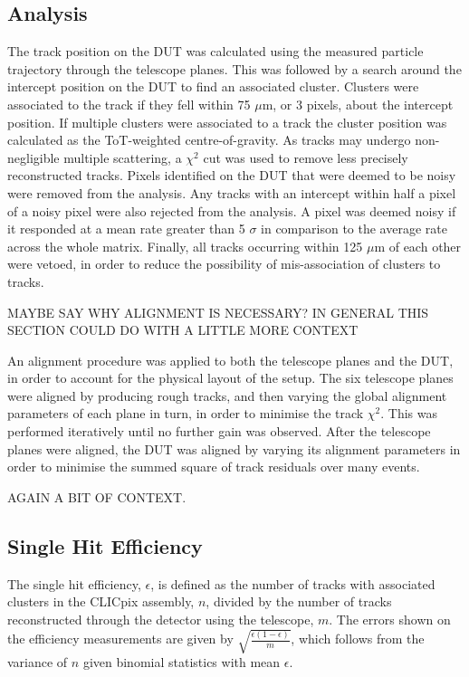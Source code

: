
\subsection{Analysis}
The track position on the DUT was calculated using the measured particle trajectory through the telescope planes.  This was followed by a search around the intercept position on the DUT to find an associated cluster.  Clusters were associated to the track if they fell within 75 $\mu$m, or 3 pixels, about the intercept position.  If multiple clusters were associated to a track the cluster position was calculated as the ToT-weighted centre-of-gravity.  As tracks may undergo non-negligible multiple scattering, a $\chi^{2}$ cut was used to remove less precisely reconstructed tracks.  Pixels identified on the DUT that were deemed to be noisy were removed from the analysis.  Any tracks with an intercept within half a pixel of a noisy pixel were also rejected from the analysis.  A pixel was deemed noisy if it responded at a mean rate greater than 5 $\sigma$ in comparison to the average rate across the whole matrix.  Finally, all tracks occurring within 125 $\mu$m of each other were vetoed, in order to reduce the possibility of mis-association of clusters to tracks. 

MAYBE SAY WHY ALIGNMENT IS NECESSARY? IN GENERAL THIS SECTION COULD DO WITH A LITTLE MORE CONTEXT

An alignment procedure was applied to both the telescope planes and the DUT, in order to account for the physical layout of the setup.  The six telescope planes were aligned by producing rough tracks, and then varying the global alignment parameters of each plane in turn, in order to minimise the track $\chi^{2}$. This was performed iteratively until no further gain was observed. After the telescope planes were aligned, the DUT was aligned by varying its alignment parameters in order to minimise the summed square of track residuals over many events.


AGAIN A BIT OF CONTEXT.

\subsection{Single Hit Efficiency}
The single hit efficiency, $\epsilon$, is defined as the number of tracks with associated clusters in the CLICpix assembly, $n$, divided by the number of tracks reconstructed through the detector using the telescope, $m$. The errors shown on the efficiency measurements are given by $\sqrt{\frac{\epsilon (1 - \epsilon)}{m}}$, which follows from the variance of $n$ given binomial statistics with mean $\epsilon$.  


